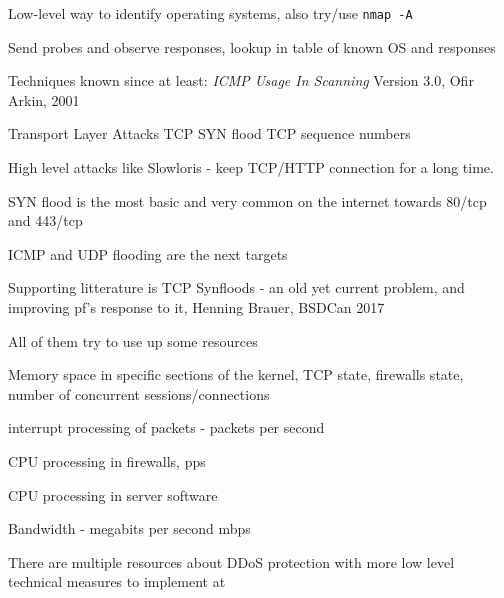 \documentclass[Screen16to9,17pt]{foils}
\begin{document}
\begin{list2}
\item Low-level way to identify operating systems, also try/use
  \verb+nmap -A+
\item Send probes and observe responses, lookup in table of known OS and responses
\item Techniques known since at least: \emph{ICMP Usage In Scanning} Version 3.0,
  Ofir Arkin, 2001 %
\end{list2}




\begin{list2}
\item Transport Layer Attacks TCP SYN flood TCP sequence numbers
\item High level attacks like Slowloris - keep TCP/HTTP connection for a long time.
\end{list2}



\begin{list2}
\item SYN flood is the most basic and very common on the internet towards 80/tcp and 443/tcp
\item ICMP and UDP flooding are the next targets
\item Supporting litterature is TCP Synfloods - an old yet current problem, and improving pf's response to it, Henning Brauer, BSDCan 2017
\item All of them try to use up some resources
\begin{list2}
\item Memory space in specific sections of the kernel, TCP state, firewalls state, number of concurrent sessions/connections
\item interrupt processing of packets - packets per second
\item CPU processing in firewalls, pps
\item CPU processing in server software
\item Bandwidth - megabits per second mbps
\end{list2}
\end{list2}

There are multiple resources about DDoS protection with more low level technical measures to implement at\\
{\footnotesize {}}
\end{document}
